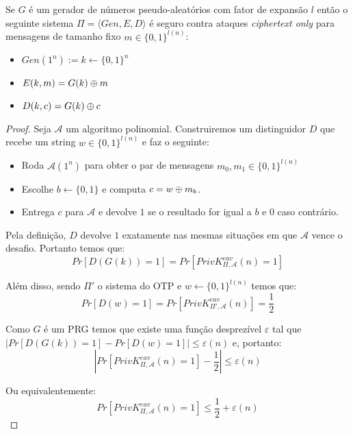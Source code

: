 \begin{theorem}
  Se $G$ é um gerador de números pseudo-aleatórios com fator de expansão $l$ então o seguinte sistema $\Pi = \langle Gen, E, D \rangle$ é seguro contra ataques {\em ciphertext only} para mensagens de tamanho fixo $m \in \{0,1\}^{l(n)}$:
\begin{itemize}
\item $Gen(1^n) := k \leftarrow \{0,1\}^n$
\item $E(k,m) = G(k) \oplus m$
\item $D(k,c) = G(k) \oplus c$
\end{itemize}
\end{theorem}
\begin{proof}
Seja $\mathcal{A}$ um algoritmo polinomial.
Construiremos um distinguidor $D$ que recebe um string $w \in \{0,1\}^{l(n)}$ e faz o seguinte:
\begin{itemize}
\item Roda $\mathcal{A}(1^n)$ para obter o par de mensagens $m_0, m_1 \in \{0,1\}^{l(n)}$
\item Escolhe $b \leftarrow \{0,1\}$ e computa $c = w \oplus m_b$.
\item Entrega $c$ para $\mathcal{A}$ e devolve $1$ se o resultado for igual a $b$ e $0$ caso contrário.
\end{itemize}

Pela definição, $D$ devolve $1$ exatamente nas mesmas situações em que $\mathcal{A}$ vence o desafio.
Portanto temos que:
\begin{displaymath}
Pr[D(G(k)) = 1] = Pr[PrivK^{eav}_{\Pi, \mathcal{A}}(n) = 1]  
\end{displaymath}

Além disso, sendo $\Pi'$ o sistema do OTP e $w \leftarrow \{0,1\}^{l(n)}$ temos que:
\begin{displaymath}
Pr[D(w) = 1] = Pr[PrivK^{eav}_{\Pi', \mathcal{A}}(n)] = \frac{1}{2}  
\end{displaymath}
 
Como $G$ é um PRG temos que existe uma função desprezível $\varepsilon$ tal que $|Pr[D(G(k)) = 1] - Pr[D(w) = 1]| \leq \varepsilon(n)$ e, portanto:
\begin{displaymath}
  |Pr[PrivK^{eav}_{\Pi, \mathcal{A}}(n) = 1] - \frac{1}{2}| \leq \varepsilon(n)
\end{displaymath}

Ou equivalentemente: 
\begin{displaymath}
   Pr[PrivK^{eav}_{\Pi, \mathcal{A}}(n) = 1] \leq \frac{1}{2} + \varepsilon(n)
\end{displaymath}
\end{proof}

